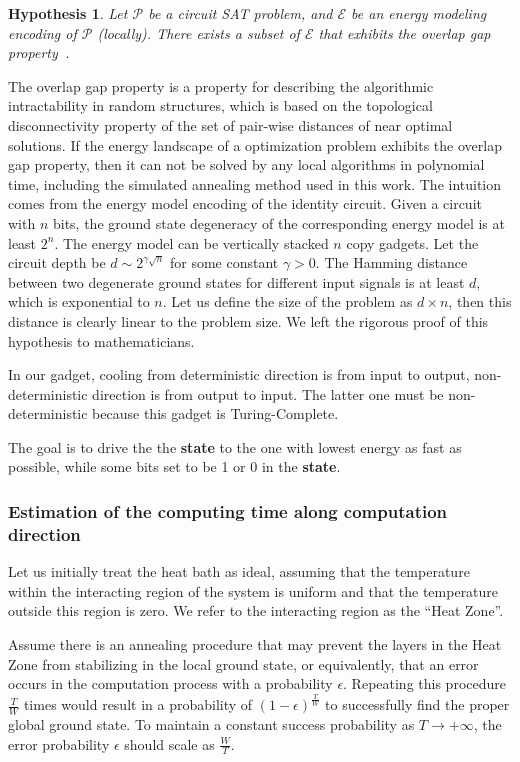 \documentclass[twocolumn,superscriptaddress,english,showpacs,longbibliography]{revtex4-2}
\newtheorem{hyp}{Hypothesis}
\begin{document}
\begin{hyp}
Let $\mathcal{P}$ be a circuit SAT problem, and $\mathcal{E}$ be an energy modeling encoding of $\mathcal{P}$ (locally). There exists a subset of $\mathcal{E}$ that exhibits the overlap gap property~\cite{Gamarnik2021}.
\end{hyp}
The overlap gap property is a property for describing the algorithmic intractability in random structures, which is based on the topological disconnectivity property of the set of pair-wise distances of near optimal solutions.
If the energy landscape of a optimization problem exhibits the overlap gap property, then it can not be solved by any local algorithms in polynomial time, including the simulated annealing method used in this work.
The intuition comes from the energy model encoding of the identity circuit.
Given a circuit with $n$ bits, the ground state degeneracy of the corresponding energy model is at least $2^n$.
The energy model can be vertically stacked $n$ copy gadgets.
Let the circuit depth be $d \sim 2^{\gamma \sqrt{n}}$ for some constant $\gamma > 0$.
The Hamming distance between two degenerate ground states for different input signals is at least $d$, which is exponential to $n$. Let us define the size of the problem as $d\times n$, then this distance is clearly linear to the problem size. We left the rigorous proof of this hypothesis to mathematicians.

In our gadget, cooling from deterministic direction is from input to
output, non-deterministic direction is from output to input. The latter
one must be non-deterministic because this gadget is Turing-Complete.

The goal is to drive the the \textbf{state} to the one with lowest energy as fast as possible, while some bits set to be 1 or 0 in the \textbf{state}.

\subsubsection{Estimation of the computing time along computation direction}\label{estimation-of-the-computing-time}

Let us initially treat the heat bath as ideal, assuming that the temperature within the interacting region of the system is uniform and that the temperature outside this region is zero. We refer to the interacting region as the ``Heat Zone''.

Assume there is an annealing procedure that may prevent the layers in the Heat Zone from stabilizing in the local ground state, or equivalently, that an error occurs in the computation process with a probability $\epsilon$. Repeating this procedure $\frac{T}{W}$ times would result in a probability of $(1-\epsilon)^{\frac{T}{W}}$ to successfully find the proper global ground state. To maintain a constant success probability as $T \rightarrow +\infty$, the error probability $\epsilon$ should scale as $\frac{W}{T}$.
\end{document}

